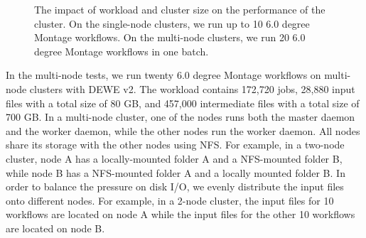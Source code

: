 \begin{figure}[t!]
\centering
\vspace{-10pt}
  \hspace{5pt}
  \hspace{5pt}
\caption{The impact of workload and cluster size on the performance of the cluster. On the single-node clusters, we run up to 10 6.0 degree Montage workflows. On the multi-node clusters, we run 20 6.0 degree Montage workflows in one batch.}   
  \label{fig:small_scale_summary} 
\end{figure}

In the multi-node tests, we run twenty 6.0 degree Montage workflows on multi-node clusters with DEWE v2. The workload contains 172,720 jobs, 28,880 input files with a total size of 80 GB, and 457,000 intermediate files with a total size of 700 GB. In a multi-node cluster, one of the nodes runs both the master daemon and the worker daemon, while the other nodes run the worker daemon. All nodes share its storage with the other nodes using NFS. For example, in a two-node cluster, node A has a locally-mounted folder A and a NFS-mounted folder B, while node B has a NFS-mounted folder A and a locally mounted folder B. In order to balance the pressure on disk I/O, we evenly distribute the input files onto different nodes. For example, in a 2-node cluster, the input files for 10 workflows are located on node A while the input files for the other 10 workflows are located on node B.

